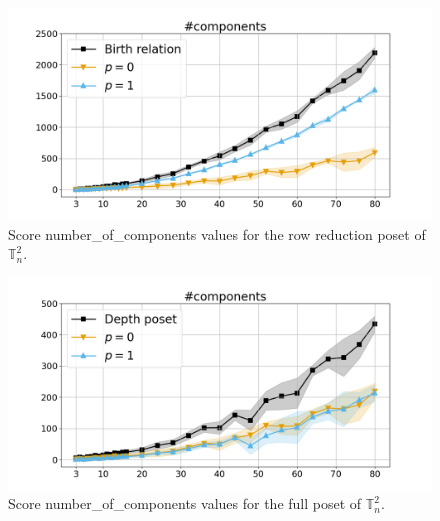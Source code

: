 \documentclass{article}
\begin{document}
    \begin{figure}[h!]
        \centering
        \hspace*{-0.24\textwidth}
        \includegraphics[width=1.4\textwidth]{pics/extended torus scores/score=number-of-components, dim=2, object=row reduction.png}
        \caption{Score number\_of\_components values for the row reduction poset of $\mathbb{T}_n^{2}$.}
        \label{fig:numberofcomponents-rowreduction2}
    \end{figure}
    \begin{figure}[h!]
        \centering
        \hspace*{-0.24\textwidth}
        \includegraphics[width=1.4\textwidth]{pics/extended torus scores/score=number-of-components, dim=2, object=full.png}
        \caption{Score number\_of\_components values for the full poset of $\mathbb{T}_n^{2}$.}
        \label{fig:numberofcomponents-full2}
    \end{figure}
\end{document}
